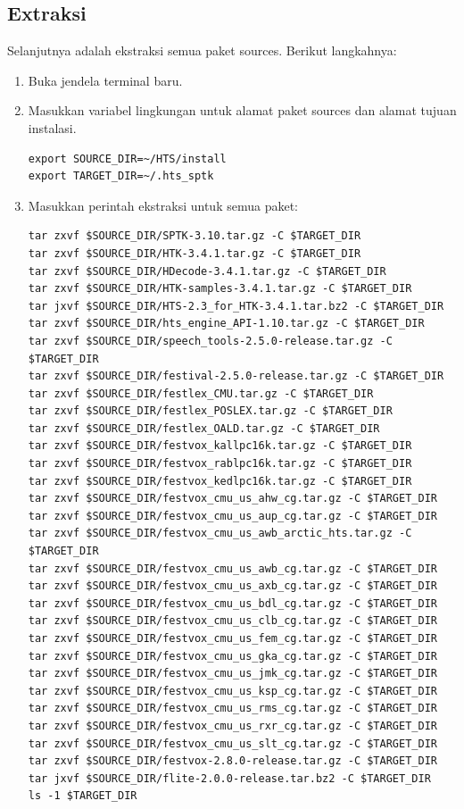 \documentclass[12pt,]{article}
\begin{document}
	\subsection{Extraksi}

	Selanjutnya adalah ekstraksi semua paket sources.
	Berikut langkahnya:

	\begin{enumerate}
		\item Buka jendela terminal baru.

		\item Masukkan variabel lingkungan untuk alamat paket sources dan alamat tujuan instalasi.
		\begin{verbatim}
export SOURCE_DIR=~/HTS/install
export TARGET_DIR=~/.hts_sptk
		\end{verbatim}

		\item Masukkan perintah ekstraksi untuk semua paket:
		\begin{verbatim}
tar zxvf $SOURCE_DIR/SPTK-3.10.tar.gz -C $TARGET_DIR
tar zxvf $SOURCE_DIR/HTK-3.4.1.tar.gz -C $TARGET_DIR
tar zxvf $SOURCE_DIR/HDecode-3.4.1.tar.gz -C $TARGET_DIR
tar zxvf $SOURCE_DIR/HTK-samples-3.4.1.tar.gz -C $TARGET_DIR
tar jxvf $SOURCE_DIR/HTS-2.3_for_HTK-3.4.1.tar.bz2 -C $TARGET_DIR
tar zxvf $SOURCE_DIR/hts_engine_API-1.10.tar.gz -C $TARGET_DIR
tar zxvf $SOURCE_DIR/speech_tools-2.5.0-release.tar.gz -C $TARGET_DIR
tar zxvf $SOURCE_DIR/festival-2.5.0-release.tar.gz -C $TARGET_DIR
tar zxvf $SOURCE_DIR/festlex_CMU.tar.gz -C $TARGET_DIR
tar zxvf $SOURCE_DIR/festlex_POSLEX.tar.gz -C $TARGET_DIR
tar zxvf $SOURCE_DIR/festlex_OALD.tar.gz -C $TARGET_DIR
tar zxvf $SOURCE_DIR/festvox_kallpc16k.tar.gz -C $TARGET_DIR
tar zxvf $SOURCE_DIR/festvox_rablpc16k.tar.gz -C $TARGET_DIR
tar zxvf $SOURCE_DIR/festvox_kedlpc16k.tar.gz -C $TARGET_DIR
tar zxvf $SOURCE_DIR/festvox_cmu_us_ahw_cg.tar.gz -C $TARGET_DIR
tar zxvf $SOURCE_DIR/festvox_cmu_us_aup_cg.tar.gz -C $TARGET_DIR
tar zxvf $SOURCE_DIR/festvox_cmu_us_awb_arctic_hts.tar.gz -C $TARGET_DIR
tar zxvf $SOURCE_DIR/festvox_cmu_us_awb_cg.tar.gz -C $TARGET_DIR
tar zxvf $SOURCE_DIR/festvox_cmu_us_axb_cg.tar.gz -C $TARGET_DIR
tar zxvf $SOURCE_DIR/festvox_cmu_us_bdl_cg.tar.gz -C $TARGET_DIR
tar zxvf $SOURCE_DIR/festvox_cmu_us_clb_cg.tar.gz -C $TARGET_DIR
tar zxvf $SOURCE_DIR/festvox_cmu_us_fem_cg.tar.gz -C $TARGET_DIR
tar zxvf $SOURCE_DIR/festvox_cmu_us_gka_cg.tar.gz -C $TARGET_DIR
tar zxvf $SOURCE_DIR/festvox_cmu_us_jmk_cg.tar.gz -C $TARGET_DIR
tar zxvf $SOURCE_DIR/festvox_cmu_us_ksp_cg.tar.gz -C $TARGET_DIR
tar zxvf $SOURCE_DIR/festvox_cmu_us_rms_cg.tar.gz -C $TARGET_DIR
tar zxvf $SOURCE_DIR/festvox_cmu_us_rxr_cg.tar.gz -C $TARGET_DIR
tar zxvf $SOURCE_DIR/festvox_cmu_us_slt_cg.tar.gz -C $TARGET_DIR
tar zxvf $SOURCE_DIR/festvox-2.8.0-release.tar.gz -C $TARGET_DIR
tar jxvf $SOURCE_DIR/flite-2.0.0-release.tar.bz2 -C $TARGET_DIR
ls -1 $TARGET_DIR
		\end{verbatim}


\end{enumerate}
\end{document}
